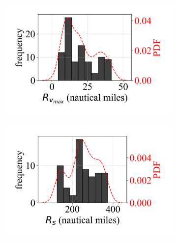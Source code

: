 \begin{figure}[ht]
    \centering
    \begin{subfigure}[t]{0.55\textwidth}
        \centering
        \includegraphics[clip, trim=0cm 0.7cm 0.1cm 0.5cm, width=\linewidth]{figures/Rmw_kde.png}
        \caption{}
    \end{subfigure}%
    \hspace*{\fill}
    \begin{subfigure}[t]{0.55\textwidth}
        \centering
        \includegraphics[clip, trim=0cm 0.7cm 0.1cm 0.5cm,width=\linewidth]{figures/Rs_kde.png}
        \caption{}
    \end{subfigure}
    \bigskip
    \hspace*{\fill}
    \begin{subfigure}[t]{0.55\textwidth}
        \centering

\end{subfigure}
\end{figure}
